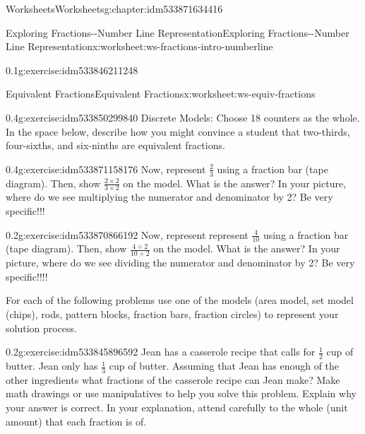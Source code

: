 \documentclass[twoside,11pt,]{book}
\begin{document}
\begin{chapterptx}{Worksheets}{}{Worksheets}{}{}{g:chapter:idm533871634416}
\begin{worksheet-section-numberless}{Exploring Fractions-{}-{}Number Line Representation}{}{Exploring Fractions-{}-{}Number Line Representation}{}{}{x:worksheet:ws-fractions-intro-numberline}
\begin{divisionexercise}{2}{}{0.1}{g:exercise:idm533846211248}
\end{divisionexercise}%
\end{worksheet-section-numberless}
\restoregeometry
%
%
\typeout{************************************************}
\typeout{************************************************}
%
\begin{worksheet-section-numberless}{Equivalent Fractions}{}{Equivalent Fractions}{}{}{x:worksheet:ws-equiv-fractions}
\begin{divisionexercise}{1}{}{0.4}{g:exercise:idm533850299840}%
Discrete Models: Choose 18 counters as the whole. In the space below, describe how you might convince a student that two-thirds, four-sixths, and six-ninths are equivalent fractions.%
\end{divisionexercise}%
\begin{divisionexercise}{2}{}{0.4}{g:exercise:idm533871158176}%
Now, represent \(\frac{2}{3} \) using a fraction bar (tape diagram). Then, show  \(\frac{2 \times 2}{3 \times 2} \) on the model. What is the answer? In your picture, where do we see multiplying the numerator and denominator by 2? Be very specific!!!%
\end{divisionexercise}%
\begin{divisionexercise}{3}{}{0.2}{g:exercise:idm533870866192}%
Now, represent represent \(\frac{4}{10} \) using a fraction bar (tape diagram). Then, show  \(\frac{4 \div 2}{10 \div 2} \) on the model. What is the answer? In your picture, where do we see dividing the numerator and denominator by 2? Be very specific!!!!%
\end{divisionexercise}%
\begin{introduction}{}%
For each of the following problems use one of the models (area model, set model (chips), rods, pattern blocks, fraction bars, fraction circles) to represent your solution process.%
\end{introduction}%
\begin{divisionexercise}{4}{}{0.2}{g:exercise:idm533845896592}%
Jean has a casserole recipe that calls for \(\frac{1}{2} \) cup of butter. Jean only has \(\frac{1}{3} \) cup of butter. Assuming that Jean has enough of the other ingredients what fractions of the casserole recipe can Jean make? Make math drawings or use manipulatives to help you solve this problem. Explain why your answer is correct. In your explanation, attend carefully to the whole (unit amount) that each fraction is of.%
\end{divisionexercise}%

\end{worksheet-section-numberless}
\end{chapterptx}
\end{document}
